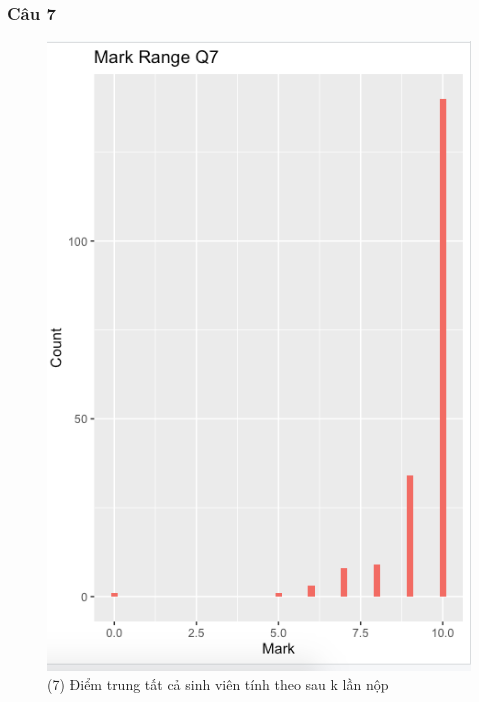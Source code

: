 \documentclass[a4paper]{article}
\theoremstyle{definition}
\begin{document}
\subsubsection{Câu 7}
\begin{figure}[!ht]
    \centering
    \includegraphics[scale=0.4]{Pics/q7-plot2.png}
    \caption{(7) Điểm trung tất cả sinh viên tính theo sau k lần nộp}
    \label{fig:my_label}
\end{figure}
\newpage
\end{document}
